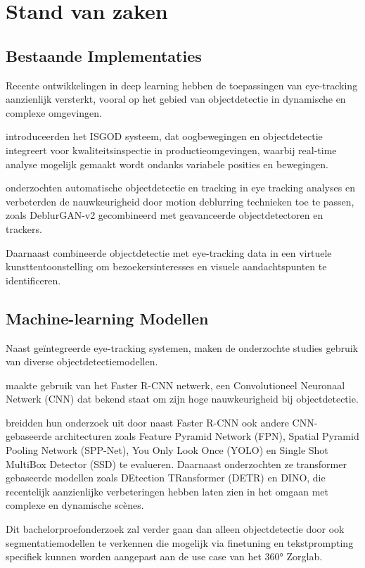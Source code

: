 
\section{Stand van zaken}%
\label{sec:literatuurstudie}

\subsection{Bestaande Implementaties}

Recente ontwikkelingen in deep learning hebben de toepassingen van eye-tracking aanzienlijk versterkt, vooral op het gebied van objectdetectie in dynamische en complexe omgevingen.
\par
\textcite{ChoEtAl2024} introduceerden het ISGOD systeem, dat oogbewegingen en objectdetectie 
integreert voor kwaliteitsinspectie in productieomgevingen, waarbij real-time analyse mogelijk ge\-maakt wordt ondanks variabele posities en bewegingen. 

\textcite{CederinBremberg2023} onderzochten automatische objectdetectie en tracking in eye tracking analyses en verbeterden de nauwkeurigheid 
door motion deblurring technieken toe te passen, zoals DeblurGAN-v2 gecombineerd met geavanceerde objectdetectoren en trackers. 

Daarnaast combineerde \textcite{Kulyk2023} objectdetectie met eye-tracking data in een virtuele kunsttentoonstelling 
om bezoekersinteresses en visuele aandachtspunten te identificeren. 

\subsection{Machine-learning Modellen}

Naast geïntegreerde eye-tracking systemen, maken de onderzochte studies gebruik van diverse objectdetectiemodellen. 
\par
\textcite{Kulyk2023} maakte gebruik van het Faster R-CNN netwerk, een Convolutioneel Neuronaal Netwerk (CNN) dat 
bekend staat om zijn hoge nauwkeurigheid bij objectdetectie.

\textcite{CederinBremberg2023} breidden hun onderzoek uit door 
naast Faster R-CNN ook andere CNN-gebaseerde architecturen zoals Feature Pyramid Network (FPN), Spatial Pyramid Pooling Network (SPP-Net), 
You Only Look Once (YOLO) en Single Shot MultiBox Detector (SSD) te evalueren. 
Daarnaast onderzochten ze transformer gebaseerde modellen zoals DEtection TRansformer (DETR) en DINO, 
die recentelijk aanzienlijke verbeteringen hebben laten zien in het omgaan met complexe en dynamische scènes.
\par
Dit bachelorproefonderzoek zal verder gaan dan alleen objectdetectie door ook segmentatiemodellen te verkennen 
die mogelijk via finetuning en tekstprompting specifiek kunnen worden aangepast aan de use case van het 360° Zorglab. 


